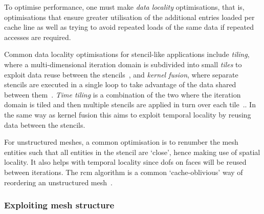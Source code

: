 To optimise performance, one must make \textit{data locality} optimisations, that is, optimisations that ensure greater utilisation of the additional entries loaded per cache line as well as trying to avoid repeated loads of the same data if repeated accesses are required.

Common data locality optimisations for stencil-like applications include \textit{tiling}, where a multi-dimensional iteration domain is subdivided into small \textit{tiles} to exploit data reuse between the stencils~\cite{irigoinSupernodePartitioning1988,ramanujamTilingMultidimensionalIteration1992}, and \textit{kernel fusion}, where separate stencils are executed in a single loop to take advantage of the data shared between them~\cite{darteComplexityLoopFusion2000}.
\textit{Time tiling} is a combination of the two where the iteration domain is tiled and then multiple stencils are applied in turn over each tile~\cite{luporiniAutomatedTilingUnstructured2019}..
In the same way as kernel fusion this aims to exploit temporal locality by reusing data between the stencils.

For unstructured meshes, a common optimisation is to renumber the mesh entities such that all entities in the stencil are `close', hence making use of spatial locality.
It also helps with temporal locality since \glspl{dof} on faces will be reused between iterations.
The \gls{rcm} algorithm is a common `cache-oblivious' way of reordering an unstructured mesh~\cite{cuthillReducingBandwidthSparse1969,langeEfficientMeshManagement2016}.

\subsubsection{Exploiting mesh structure}
\label{sec:background_structure}

